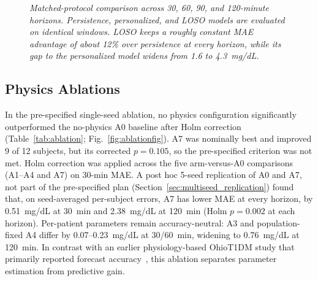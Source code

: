 \documentclass[journal]{IEEEtran}
\begin{document}
\begin{figure}[t]
\centering


\caption{\small\textit{Matched-protocol comparison across 30, 60, 90, and 120-minute horizons. Persistence, personalized, and LOSO models are evaluated on identical windows. LOSO keeps a roughly constant MAE advantage of about 12\% over persistence at every horizon, while its gap to the personalized model widens from 1.6 to 4.3~mg/dL.}}
\label{fig:matched_protocol_comparison}
\end{figure}


\subsection{Physics Ablations}
In the pre-specified single-seed ablation, no physics configuration significantly outperformed the no-physics A0 baseline after Holm correction (Table~\ref{tab:ablation}; Fig.~\ref{fig:ablationfig}). A7 was nominally best and improved 9 of 12 subjects, but its corrected $p = 0.105$, so the pre-specified criterion was not met. Holm correction was applied across the five arm-versus-A0 comparisons (A1--A4 and A7) on 30-min MAE. A post hoc 5-seed replication of A0 and A7, not part of the pre-specified plan (Section~\ref{sec:multiseed_replication}) found that, on seed-averaged per-subject errors, A7 has lower MAE at every horizon, by 0.51~mg/dL at 30~min and 2.38~mg/dL at 120~min (Holm $p = 0.002$ at each horizon). Per-patient parameters remain accuracy-neutral: A3 and population-fixed A4 differ by 0.07--0.23~mg/dL at 30/60~min, widening to 0.76~mg/dL at 120~min. In contrast with an earlier physiology-based OhioT1DM study that primarily reported forecast accuracy~\cite{ref58}, this ablation separates parameter estimation from predictive gain.
\end{document}
